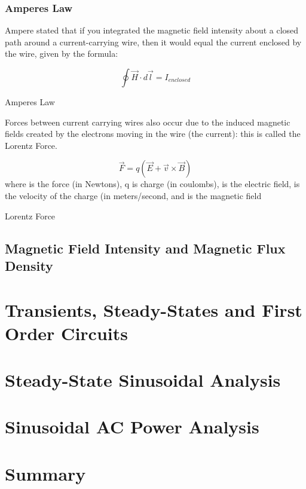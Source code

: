 \documentclass[12pt, letterpaper]{memoir}
\begin{document}
\subsection{Amperes Law}
Ampere stated that if you integrated the magnetic field intensity about a closed path around a current-carrying wire, then it would equal the current enclosed by the wire, given by the formula:

\begin{eqlisting}
	\begin{equation}
	\oint \overrightarrow{H} \cdot d\overrightarrow{l} = I_{enclosed}
	\end{equation}
\caption{\scriptsize Amperes Law}
\end{eqlisting}

Forces between current carrying wires also occur due to the induced magnetic fields created by the electrons moving in the wire (the current): this is called the Lorentz Force.

\begin{eqlisting}
	\begin{equation}
	\overrightarrow{F} = q(\overrightarrow{E} + \overrightarrow{v} \times \overrightarrow{B})
	\end{equation}
\tiny where  is the force (in Newtons), q is charge (in coulombs),  is the electric field,  is the velocity of the charge (in meters/second, and  is the magnetic field
	\caption{Lorentz Force}
\end{eqlisting}

\section{Magnetic Field Intensity and Magnetic Flux Density}






\chapter{Transients, Steady-States and First Order Circuits}

\chapter{Steady-State Sinusoidal Analysis}

\chapter{Sinusoidal AC Power Analysis}

\chapter{Summary}
\end{document}
